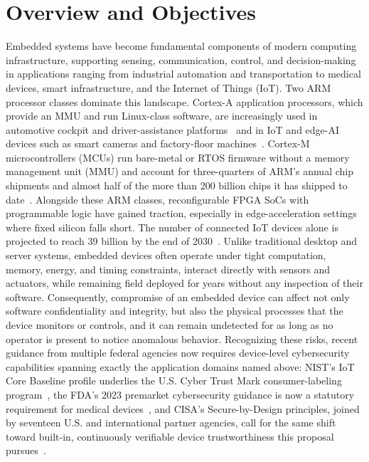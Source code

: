 \section{Overview and Objectives}
\label{sec:overview}

Embedded systems have become fundamental components of modern computing infrastructure, supporting sensing, communication, control,
and decision-making in applications ranging from industrial automation and transportation to medical devices, smart infrastructure, and the Internet of Things (IoT).
Two ARM processor classes dominate this landscape.
Cortex-A application processors, which provide an MMU and run Linux-class software, are increasingly used in automotive cockpit and driver-assistance platforms~\cite{arm2024automotive} and in IoT and edge-AI devices such as smart cameras and factory-floor machines~\cite{arm2025a320}.
Cortex-M microcontrollers (MCUs) run bare-metal or RTOS firmware without a memory management unit (MMU) and account for three-quarters of ARM's annual chip shipments and almost half of the more than 200 billion chips it has shipped to date~\cite{arm2021chips}.
Alongside these ARM classes, reconfigurable FPGA SoCs with programmable logic have gained traction, especially in edge-acceleration settings where fixed silicon falls short.
The number of connected IoT devices alone is projected to reach 39 billion by the end of 2030~\cite{iotanalytics2025}.
Unlike traditional desktop and server systems, embedded devices often operate under tight computation, memory, energy, and timing constraints, interact directly with sensors and actuators, while remaining field deployed for years without any inspection of their software.
Consequently, compromise of an embedded device can affect not only software confidentiality and integrity, but also the physical
processes that the device monitors or controls, and it can remain undetected for as long as no operator is present to notice anomalous behavior.
Recognizing these risks, recent guidance from multiple federal agencies now requires device-level cybersecurity capabilities spanning exactly the application domains named above: NIST's IoT Core Baseline profile underlies the U.S. Cyber Trust Mark consumer-labeling program~\cite{nist2022ir8425}, the FDA's 2023 premarket cybersecurity guidance is now a statutory requirement for medical devices~\cite{fda2023cybersecurity}, and CISA's Secure-by-Design principles, joined by seventeen U.S. and international partner agencies, call for the same shift toward built-in, continuously verifiable device trustworthiness this proposal pursues~\cite{cisa2023sbd}.

